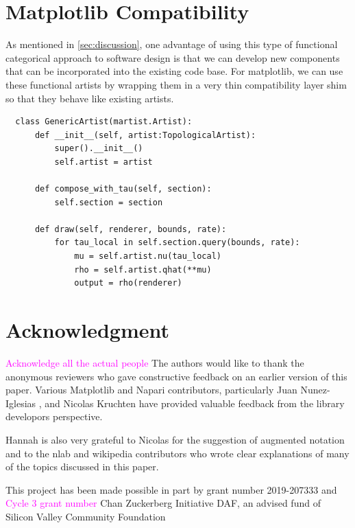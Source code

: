 \documentclass[journal]{IEEEtran}
\newcommand{\note}[1]{\textcolor{magenta}{#1}}
\theoremstyle{definition}
\theoremstyle{remark}
\begin{document}
\pagebreak
\section{Matplotlib Compatibility}
\label{sec:appendix:artist_shim}

As mentioned in \autoref{sec:discussion}, one advantage of using this type of
functional categorical approach to software design is that we can develop new
components that can be incorporated into the existing code base. For matplotlib,
we can use these functional artists by wrapping them in a very thin compatibility
layer shim so that they behave like existing artists.

\begin{verbatim}
  class GenericArtist(martist.Artist):
      def __init__(self, artist:TopologicalArtist):
          super().__init__()
          self.artist = artist

      def compose_with_tau(self, section):
          self.section = section

      def draw(self, renderer, bounds, rate):
          for tau_local in self.section.query(bounds, rate):
              mu = self.artist.nu(tau_local)
              rho = self.artist.qhat(**mu)
              output = rho(renderer)
  \end{verbatim}

\section*{Acknowledgment}
\note{Acknowledge all the actual people}
The authors would like to thank the anonymous reviewers who gave constructive feedback on
an earlier version of this paper. Various Matplotlib and Napari contributors, particularly
Juan Nunez-Iglesias , and Nicolas Kruchten have provided valuable feedback from the
library developors perspective.

Hannah is also very grateful to Nicolas for the suggestion of augmented notation and to
the nlab and wikipedia contributors who wrote clear explanations of many of the topics
discussed in this paper.

This project has been made possible in part by grant number 2019-207333 and \note{Cycle 3 grant number} Chan Zuckerberg Initiative DAF, an advised fund of Silicon Valley Community Foundation


\ifCLASSOPTIONcaptionsoff
  \newpage
\fi
\end{document}
